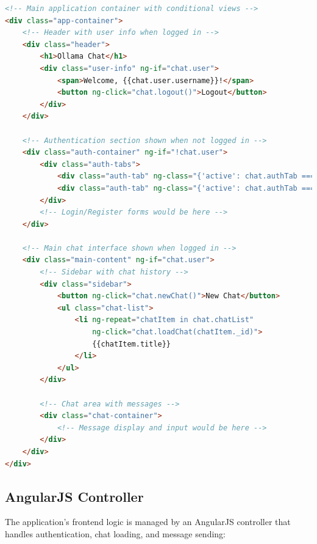 \documentclass[12pt,a4paper]{article}
\begin{document}
\begin{lstlisting}[language=HTML]
<!-- Main application container with conditional views -->
<div class="app-container">
    <!-- Header with user info when logged in -->
    <div class="header">
        <h1>Ollama Chat</h1>
        <div class="user-info" ng-if="chat.user">
            <span>Welcome, {{chat.user.username}}!</span>
            <button ng-click="chat.logout()">Logout</button>
        </div>
    </div>

    <!-- Authentication section shown when not logged in -->
    <div class="auth-container" ng-if="!chat.user">
        <div class="auth-tabs">
            <div class="auth-tab" ng-class="{'active': chat.authTab === 'login'}">Login</div>
            <div class="auth-tab" ng-class="{'active': chat.authTab === 'register'}">Register</div>
        </div>
        <!-- Login/Register forms would be here -->
    </div>

    <!-- Main chat interface shown when logged in -->
    <div class="main-content" ng-if="chat.user">
        <!-- Sidebar with chat history -->
        <div class="sidebar">
            <button ng-click="chat.newChat()">New Chat</button>
            <ul class="chat-list">
                <li ng-repeat="chatItem in chat.chatList"
                    ng-click="chat.loadChat(chatItem._id)">
                    {{chatItem.title}}
                </li>
            </ul>
        </div>

        <!-- Chat area with messages -->
        <div class="chat-container">
            <!-- Message display and input would be here -->
        </div>
    </div>
</div>
\end{lstlisting}

\subsection{AngularJS Controller}
The application's frontend logic is managed by an AngularJS controller that handles authentication, chat loading, and message sending:
\end{document}
